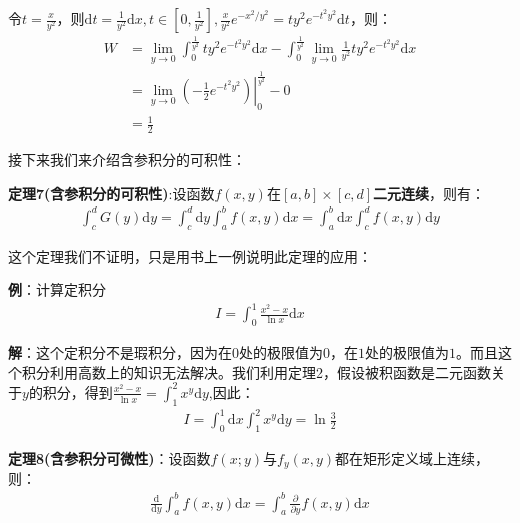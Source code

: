 \documentclass{ctexart}
\let\oldtextbf\textbf
\renewcommand{\textbf}[1]{\textcolor{brown!50!red}{\oldtextbf{#1}}}
\begin{document}
令$t=\frac{x}{y^2}$，则$\mathrm{d}t=\frac{1}{y^2}\mathrm{d}x,t\in[0,\frac{1}{y^2}],\frac{x}{y^2}e^{-x^2/y^2}=ty^2e^{-t^2y^2}\mathrm{d}t$，则：
\begin{align*}
   W&= \lim_{y\to 0}\int_0^\frac{1}{y^2}ty^2e^{-t^2y^2}\mathrm{d}x-\int_0^
\frac{1}{y^2}\lim_{y\to 0}\frac{1}{y^2}ty^2e^{-t^2y^2}\mathrm{d}x\\
&=\left.\lim_{y\to 0}(-\frac{1}{2}e^{-t^2y^2})\right|_0^{\frac{1}{y^2}}-0\\
&=\frac{1}{2} 
\end{align*}

接下来我们来介绍含参积分的可积性：
\begin{tcolorbox}[
    colback=bac2,     %
    colframe=fra2,   %
    coltitle=white,             %
    coltext=tex2,
    title=含参积分的可积性,
    fonttitle=\bfseries,        %
arc=3mm,                     %
breakable
]
\textbf{\color{brown!50!red}定理7(含参积分的可积性)}:设函数$f(x,y)$在$[a,b]\times[c,d]$\textbf{\color{brown!50!red}二元连续}，则有：
\begin{align*}
    \int_c^d G(y)\mathrm{d}y=\int_c^d\mathrm{d}y\int_a^bf(x,y)\mathrm{d}x=\int_a^b\mathrm{d}x\int_c^df(x,y)\mathrm{d}y
\end{align*}

\end{tcolorbox}


这个定理我们不证明，只是用书上一例说明此定理的应用：

\textbf{\color{brown!50!red}例}：计算定积分
\begin{align*}
    I=\int_0^1\frac{x^2-x}{\ln x}\mathrm{d}x
\end{align*}

\textbf{\color{brown!50!red}解}：这个定积分不是瑕积分，因为在$0$处的极限值为$0$，在$1$处的极限值为$1$。而且这个积分利用高数上的知识无法解决。我们利用定理2，假设被积函数是二元函数关于$y$的积分，得到$\frac{x^2-x}{\ln x}=\int_1^2 x^y\mathrm{d}y$,因此：
\begin{align*}
  I=\int_0^1\mathrm{d}x\int_1^2x^y\mathrm{d}y=\ln\frac{3}{2}  
\end{align*}
\begin{tcolorbox}[
    colback=bac2,     %
    colframe=fra2,   %
    coltitle=white,             %
    coltext=tex2,
    title=圆角框,
    fonttitle=\bfseries,        %
arc=3mm,                     %
breakable
]
\textbf{\color{brown!50!red}定理8(含参积分可微性)}：设函数$f(x;y)$与$f_y(x,y)$都在矩形定义域上连续，则：
\begin{align*}
    \frac{\mathrm{d}}{\mathrm{d}y}\int_a^bf(x,y)\mathrm{d}x=\int_a^b\frac{\partial}{\partial y}f(x,y)\mathrm{d}x
\end{align*}
\end{tcolorbox}
\end{document}
